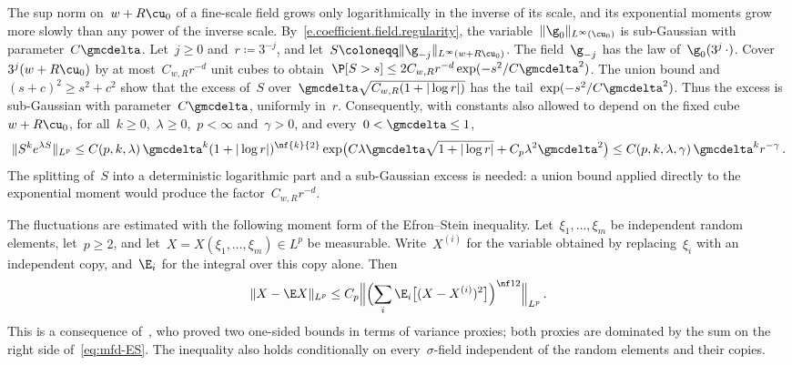 \documentclass[11pt]{amsart}
\begin{document}
The sup norm on~$w+R\cu_0$ of a fine-scale field grows only logarithmically in the inverse of its scale, and its exponential moments grow more slowly than any power of the inverse scale. By~\eqref{e.coefficient.field.regularity}, the variable~$\|\g_0\|_{L^\infty(\cu_0)}$ is sub-Gaussian with parameter~$C\gmcdelta$. Let~$j\geq0$ and~$r\coloneqq3^{-j}$, and let~$S\coloneqq\|\g_{-j}\|_{L^\infty(w+R\cu_0)}$. The field~$\g_{-j}$ has the law of~$\g_0(3^j\,\cdot)$. Cover~$3^j(w+R\cu_0)$ by at most~$C_{w,R}r^{-d}$ unit cubes to obtain~$\P[S>s]\leq2C_{w,R}r^{-d}\exp(-s^2/C\gmcdelta^2)$. The union bound and~$(s+c)^2\geq s^2+c^2$ show that the excess of~$S$ over~$\gmcdelta\sqrt{C_{w,R}(1+|\log r|)}$ has the tail~$\exp(-s^2/C\gmcdelta^2)$. Thus the excess is sub-Gaussian with parameter~$C\gmcdelta$, uniformly in~$r$. Consequently, with constants also allowed to depend on the fixed cube~$w+R\cu_0$, for all~$k\geq0$,~$\lambda\geq0$,~$p<\infty$ and~$\gamma>0$, and every~$0<\gmcdelta\leq1$,
\begin{equation}
	\|S^ke^{\lambda S}\|_{L^p}
	\leq C(p,k,\lambda)\,\gmcdelta^{k}(1+|\log r|)^{\nf{k}{2}}
	\exp\bigl(C\lambda\gmcdelta\sqrt{1+|\log r|}+C_p\lambda^2\gmcdelta^2\bigr)
	\leq C(p,k,\lambda,\gamma)\,\gmcdelta^{k}r^{-\gamma}\,.
	\label{eq:mfd-layernorm}
\end{equation}
The splitting of~$S$ into a deterministic logarithmic part and a sub-Gaussian excess is needed: a union bound applied directly to the exponential moment would produce the factor~$C_{w,R}r^{-d}$.

\smallskip

The fluctuations are estimated with the following moment form of the Efron--Stein inequality. Let~$\xi_1,\dots,\xi_m$ be independent random elements, let~$p\geq2$, and let~$X=X(\xi_1,\dots,\xi_m)\in L^p$ be measurable. Write~$X^{(i)}$ for the variable obtained by replacing~$\xi_i$ with an independent copy, and~$\E_i$ for the integral over this copy alone. Then
\begin{equation}
	\|X-\E X\|_{L^p}\leq C_p\Bigl\|\Bigl(\sum_i\E_i\bigl[(X-X^{(i)})^2\bigr]\Bigr)^{\nf12}\Bigr\|_{L^p}\,.
	\label{eq:mfd-ES}
\end{equation}
This is a consequence of~\citet*[Theorem~2]{BBLM2005}, who proved two one-sided bounds in terms of variance proxies; both proxies are dominated by the sum on the right side of~\eqref{eq:mfd-ES}. The inequality also holds conditionally on every~$\sigma$-field independent of the random elements and their copies.
\end{document}
